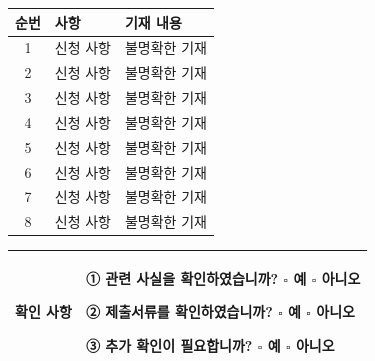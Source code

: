 \documentclass[UTF8,10pt,a4paper,fontset=fandol]{ctexart}
\newcommand{\fieldvalue}[1]{#1}
\newcommand{\handwritten}[1]{#1}
\begin{document}
\noindent
\begin{tabularx}{\textwidth}{|c|X|X|}
\hline
순번 & 사항 & 기재 내용 \\
\hline
1 &
신청 사항 &
\fieldvalue{\handwritten{불명확한 기재}} \\
\hline
2 &
신청 사항 &
\fieldvalue{\handwritten{불명확한 기재}} \\
\hline
3 &
신청 사항 &
\fieldvalue{\handwritten{불명확한 기재}} \\
\hline
4 &
신청 사항 &
\fieldvalue{\handwritten{불명확한 기재}} \\
\hline
5 &
신청 사항 &
\fieldvalue{\handwritten{불명확한 기재}} \\
\hline
6 &
신청 사항 &
\fieldvalue{\handwritten{불명확한 기재}} \\
\hline
7 &
신청 사항 &
\fieldvalue{\handwritten{불명확한 기재}} \\
\hline
8 &
신청 사항 &
\fieldvalue{\handwritten{불명확한 기재}} \\
\hline
\end{tabularx}

\vspace{0.5em}

\noindent
\begin{tabularx}{\textwidth}{|l|X|}
\hline
확인 사항 &
\begin{minipage}[t]{\linewidth}
① 관련 사실을 확인하였습니까? \(\square\) 예 \(\square\) 아니오

② 제출서류를 확인하였습니까? \(\square\) 예 \(\square\) 아니오

③ 추가 확인이 필요합니까? \(\square\) 예 \(\square\) 아니오
\end{minipage}
\\
\hline
\end{tabularx}

\vfill
\end{document}
